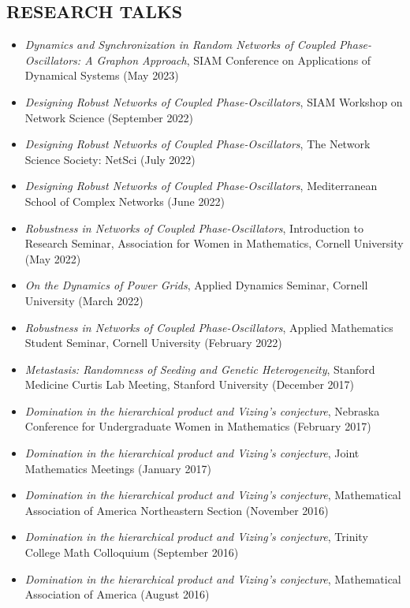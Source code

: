 \documentclass{res} %
\begin{document}
\begin{resume}
\section{RESEARCH TALKS}
\begin{itemize}
    \item \textit{Dynamics and Synchronization in Random Networks of Coupled Phase-Oscillators: A Graphon Approach}, SIAM Conference on Applications of Dynamical Systems (May 2023)
    \item \textit{Designing Robust Networks of Coupled Phase-Oscillators}, SIAM Workshop on Network Science (September 2022)
    \item \textit{Designing Robust Networks of Coupled Phase-Oscillators}, The Network Science Society: NetSci (July 2022) 
    \item \textit{Designing Robust Networks of Coupled Phase-Oscillators}, Mediterranean School of Complex Networks (June 2022)
    \item \textit{Robustness in Networks of Coupled Phase-Oscillators}, Introduction to Research Seminar, Association for Women in Mathematics, Cornell University (May 2022)
    \item \textit{On the Dynamics of Power Grids}, Applied Dynamics Seminar, Cornell University (March 2022)
    \item \textit{Robustness in Networks of Coupled Phase-Oscillators}, Applied Mathematics Student Seminar, Cornell University (February 2022)
    \item \textit{Metastasis: Randomness of Seeding and Genetic Heterogeneity}, Stanford Medicine Curtis Lab Meeting, Stanford University (December 2017)
    \item \textit{Domination in the hierarchical product and Vizing’s conjecture}, Nebraska Conference for Undergraduate Women in Mathematics (February 2017)
    \item \textit{Domination in the hierarchical product and Vizing’s conjecture}, Joint Mathematics Meetings (January 2017)
    \item \textit{Domination in the hierarchical product and Vizing’s conjecture}, Mathematical Association of America Northeastern Section (November 2016)
    \item \textit{Domination in the hierarchical product and Vizing’s conjecture}, Trinity College Math Colloquium (September 2016)
    \item \textit{Domination in the hierarchical product and Vizing’s conjecture}, Mathematical Association of America (August 2016)
\end{itemize}



\end{resume}
\end{document}
